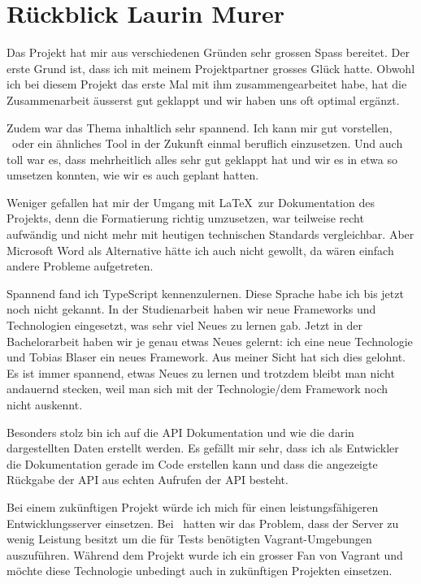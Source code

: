 \section*{Rückblick Laurin Murer}
	Das Projekt hat mir aus verschiedenen Gründen sehr grossen Spass bereitet.
	Der erste Grund ist, dass ich mit meinem Projektpartner grosses Glück hatte.
	Obwohl ich bei diesem Projekt das erste Mal mit ihm zusammengearbeitet habe,
	hat die Zusammenarbeit äusserst gut geklappt und wir haben uns oft optimal ergänzt.
	
	Zudem war das Thema inhaltlich sehr spannend.
	Ich kann mir gut vorstellen, \eeppi\ oder ein ähnliches Tool in der Zukunft einmal beruflich einzusetzen.
	Und auch toll war es, dass mehrheitlich alles sehr gut geklappt hat und wir es in etwa so umsetzen konnten, wie wir es auch geplant hatten.
	
	Weniger gefallen hat mir der Umgang mit \LaTeX\ zur Dokumentation des Projekts,
	denn die Formatierung richtig umzusetzen, war teilweise recht aufwändig
	und nicht mehr mit heutigen technischen Standards vergleichbar.
	Aber Microsoft Word als Alternative hätte ich auch nicht gewollt, da wären einfach andere Probleme aufgetreten.
	
	Spannend fand ich TypeScript kennenzulernen. Diese Sprache habe ich bis jetzt noch nicht gekannt.
	In der Studienarbeit haben wir neue Frameworks und Technologien eingesetzt, was sehr viel Neues zu lernen gab.
	Jetzt in der Bachelorarbeit haben wir je genau etwas Neues gelernt: ich eine neue Technologie und Tobias Blaser ein neues Framework.
	Aus meiner Sicht hat sich dies gelohnt. Es ist immer spannend, etwas Neues zu lernen
	und trotzdem bleibt man nicht andauernd stecken, weil man sich mit der Technologie/dem Framework noch nicht auskennt.
	
	Besonders stolz bin ich auf die API Dokumentation und wie die darin dargestellten Daten erstellt werden.
	Es gefällt mir sehr, dass ich als Entwickler die Dokumentation gerade im Code erstellen kann
	und dass die angezeigte Rückgabe der API aus echten Aufrufen der API besteht.
	
	Bei einem zukünftigen Projekt würde ich mich für einen leistungsfähigeren Entwicklungsserver einsetzen.
	Bei \eeppi\ hatten wir das Problem, dass der Server zu wenig Leistung besitzt um die für Tests benötigten Vagrant-Umgebungen auszuführen.
	Während dem Projekt wurde ich ein grosser Fan von Vagrant und möchte diese Technologie unbedingt auch in zukünftigen Projekten einsetzen.
